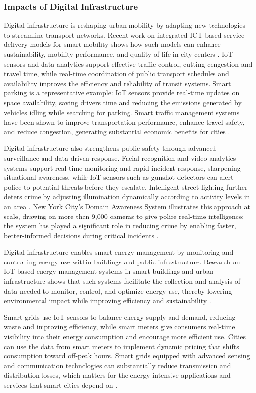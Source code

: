 \documentclass[journal]{IEEEtran}
\begin{document}
\subsubsection{Impacts of Digital Infrastructure}
Digital infrastructure is reshaping urban mobility by adapting new technologies to streamline transport networks. Recent work on integrated ICT-based service delivery models for smart mobility shows how such models can enhance sustainability, mobility performance, and quality of life in city centers \cite{r107,r15}. IoT sensors and data analytics support effective traffic control, cutting congestion and travel time, while real-time coordination of public transport schedules and availability improves the efficiency and reliability of transit systems. Smart parking is a representative example: IoT sensors provide real-time updates on space availability, saving drivers time and reducing the emissions generated by vehicles idling while searching for parking. Smart traffic management systems have been shown to improve transportation performance, enhance travel safety, and reduce congestion, generating substantial economic benefits for cities \cite{r12}.

Digital infrastructure also strengthens public safety through advanced surveillance and data-driven response. Facial-recognition and video-analytics systems support real-time monitoring and rapid incident response, sharpening situational awareness, while IoT sensors such as gunshot detectors can alert police to potential threats before they escalate. Intelligent street lighting further deters crime by adjusting illumination dynamically according to activity levels in an area \cite{r13,r17}. New York City's Domain Awareness System illustrates this approach at scale, drawing on more than 9,000 cameras to give police real-time intelligence; the system has played a significant role in reducing crime by enabling faster, better-informed decisions during critical incidents \cite{r14,r18}.

Digital infrastructure enables smart energy management by monitoring and controlling energy use within buildings and public infrastructure. Research on IoT-based energy management systems in smart buildings and urban infrastructure shows that such systems facilitate the collection and analysis of data needed to monitor, control, and optimize energy use, thereby lowering environmental impact while improving efficiency and sustainability \cite{r108,r19}.

Smart grids use IoT sensors to balance energy supply and demand, reducing waste and improving efficiency, while smart meters give consumers real-time visibility into their energy consumption and encourage more efficient use. Cities can use the data from smart meters to implement dynamic pricing that shifts consumption toward off-peak hours. Smart grids equipped with advanced sensing and communication technologies can substantially reduce transmission and distribution losses, which matters for the energy-intensive applications and services that smart cities depend on \cite{r98}.
\end{document}
